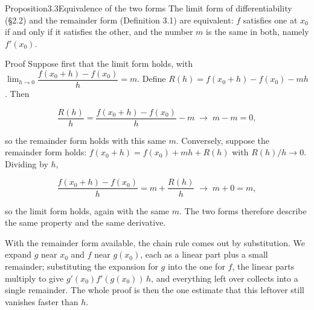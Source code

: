 \documentclass[a4paper,12pt,oneside]{memoir}
\begin{document}
\begin{envproposition}{Proposition}{3.3}{Equivalence of the two forms}
The limit form of differentiability (§2.2) and the remainder form (Definition 3.1) are equivalent: \(f\) satisfies one at \(x_{0}\) if and only if it satisfies the other, and the number \(m\) is the same in both, namely \(f'(x_{0})\).
\end{envproposition}
\begin{envproof}{Proof}{}{}
Suppose first that the limit form holds, with \(\lim_{h \to 0}\dfrac{f(x_{0}+h) - f(x_{0})}{h} = m\). Define \(R(h) = f(x_{0}+h) - f(x_{0}) - m h\). Then

\[ \frac{R(h)}{h} = \frac{f(x_{0}+h) - f(x_{0})}{h} - m \;\longrightarrow\; m - m = 0, \]

so the remainder form holds with this same \(m\). Conversely, suppose the remainder form holds: \(f(x_{0}+h) = f(x_{0}) + m h + R(h)\) with \(R(h)/h \to 0\). Dividing by \(h\),

\[ \frac{f(x_{0}+h) - f(x_{0})}{h} = m + \frac{R(h)}{h} \;\longrightarrow\; m + 0 = m, \]

so the limit form holds, again with the same \(m\). The two forms therefore describe the same property and the same derivative.
\end{envproof}
With the remainder form available, the chain rule comes out by substitution. We expand \(g\) near \(x_{0}\) and \(f\) near \(g(x_{0})\), each as a linear part plus a small remainder; substituting the expansion for \(g\) into the one for \(f\), the linear parts multiply to give \(g'(x_{0})f'(g(x_{0}))\,h\), and everything left over collects into a single remainder. The whole proof is then the one estimate that this leftover still vanishes faster than \(h\).
\end{document}

